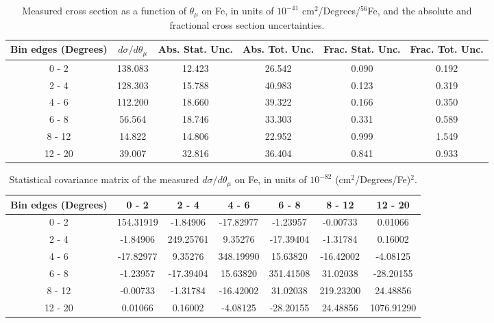 \documentclass[aps,prl,twocolumn,superscriptaddress,nofootinbib]{revtex4-1}
\begin{document}
\begin{table}[h!]
  \centering
  \caption{Measured cross section as a function of $\theta_{\mu}$ on Fe, in units of
  $10^{-41}$ $\text{cm}^{2}$/Degrees/$^{56}$Fe, and the absolute and
  fractional cross section uncertainties.}
    \begin{tabular}{c||c||c|c||c|c}
      Bin edges (Degrees)  &  $d\sigma/d\theta_{\mu}$  &  Abs. Stat. Unc. & Abs. Tot. Unc.  &  Frac. Stat. Unc.  &  Frac. Tot. Unc. \\
      \hline\hline
        0 - 2 & 138.083 & 12.423 & 26.542 & 0.090 & 0.192 \\
        2 - 4 & 128.303 & 15.788 & 40.983 & 0.123 & 0.319 \\
        4 - 6 & 112.200 & 18.660 & 39.322 & 0.166 & 0.350 \\
        6 - 8 & 56.564 & 18.746 & 33.303 & 0.331 & 0.589 \\
       8 - 12 & 14.822 & 14.806 & 22.952 & 0.999 & 1.549 \\
      12 - 20 & 39.007 & 32.816 & 36.404 & 0.841 & 0.933 \\
    \end{tabular}
  \label{table:ThetaMuXSec_Fe}
\end{table}

\begin{table}[h!]
  \centering
  \caption{Statistical covariance matrix of the measured $d\sigma/d\theta_{\mu}$ on Fe, in units of $10^{-82}$ (cm$^{2}$/Degrees/Fe)$^{2}$.}
    \begin{tabular}{c||cccccc}
      Bin edges (Degrees) & 0 - 2 & 2 - 4 & 4 - 6 & 6 - 8 & 8 - 12 & 12 - 20 \\
\hline \hline
        0 - 2 & 154.31919 & -1.84906 & -17.82977 & -1.23957 & -0.00733 &  0.01066 \\
        2 - 4 & -1.84906 & 249.25761 &  9.35276 & -17.39404 & -1.31784 &  0.16002 \\
        4 - 6 & -17.82977 &  9.35276 & 348.19990 & 15.63820 & -16.42002 & -4.08125 \\
        6 - 8 & -1.23957 & -17.39404 & 15.63820 & 351.41508 & 31.02038 & -28.20155 \\
       8 - 12 & -0.00733 & -1.31784 & -16.42002 & 31.02038 & 219.23200 & 24.48856 \\
      12 - 20 &  0.01066 &  0.16002 & -4.08125 & -28.20155 & 24.48856 & 1076.91290 \\
    \end{tabular}
  \label{tablecov:Fe_Statistical_ThetaMu}
\end{table}
\end{document}
